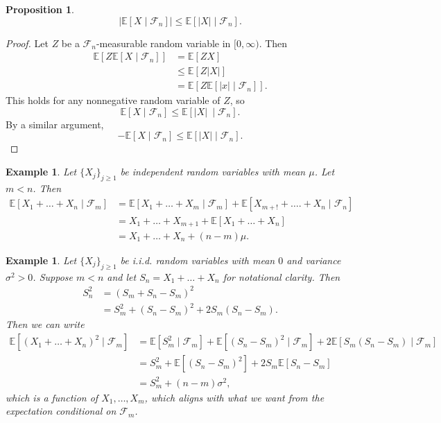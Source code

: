 \documentclass{tufte-handout}
\newcommand*\E{\mathbb{E}}
\newtheorem{ex}[thm]{Example}
\newtheorem{prop}[thm]{Proposition}
\theoremstyle{definition}
\begin{document}
\begin{prop}
	\[
		\left| \E\left[X \mid \mathscr{F}_n\right]  \right| \le \E\left[\left| X \right|\mid \mathscr{F}_n\right] 
	.\] 	
\end{prop}

\begin{proof}
	Let $Z$ be a $\mathscr{F}_n$-measurable random variable in $[0,\infty)$. Then
	\begin{align*}
		\E\left[Z \E\left[X \mid \mathscr{F}_n\right] \right] &= \E\left[ZX\right]  \\
		&\le \E\left[Z \left| X \right|\right]  \\
		&= \E\left[Z \E\left[\left| x \right| \mid \mathscr{F}_n\right] \right]
	.\end{align*}
	This holds for any nonnegative random variable of $Z$, so \[
		\E\left[X \mid \mathscr{F}_n\right] \le \E\left[\left| X \right|\ \mid \mathscr{F}_n\right] 
	.\] By a similar argument, \[
		-\E\left[X \mid \mathscr{F}_n\right] \le \E\left[\left| X \right| \mid \mathscr{F}_n\right] 
	.\] 
\end{proof}

\begin{ex}
	Let $\{X_j\}_{j \ge 1}$ be independent random variables with mean $\mu$. Let $m < n$. Then
	\begin{align*}
		\E\left[X_1+\ldots+X_n \mid \mathscr{F}_m\right] &= \E\left[X_1 +\ldots+X_m \mid \mathscr{F}_m\right] + \E\left[X_{m+!} + \ldots.+X_n \mid \mathscr{F}_n \right]  \\
		&= X_1+\ldots+X_{m+1} + \E\left[X_1 + \ldots+X_n\right] \\
		&= X_1+\ldots+X_n + \left( n-m \right)\mu
	.\end{align*}
\end{ex}

\begin{ex}
	Let $\{X_j\}_{j\ge 1}$ be i.i.d. random variables with mean $0$ and variance $\sigma^2 > 0$. Suppose $m < n$ and let $S_n = X_1 + \ldots+X_n$ for notational clarity. Then
	\begin{align*}
		S_n^2 &= \left( S_m + S_n - S_m \right)^2 \\
			  &= S_m^2 + (S_n-S_m)^2 + 2S_m(S_n - S_m)
	.\end{align*}
	Then we can write
	\begin{align*}
		\E\left[\left( X_1+\ldots+X_n \right)^2 \mid \mathscr{F}_m\right] &= \E\left[S_m^2 \mid \mathscr{F}_m\right] + \E\left[\left( S_n - S_m \right)^2 \mid \mathscr{F}_m\right] + 2 \E\left[S_m(S_n-S_m) \mid \mathscr{F}_m\right]  \\
		&= S_m^2 + \E\left[(S_n-S_m)^2\right] + 2S_m \E\left[S_n - S_m\right] \\
		&= S_m^2 + (n-m)\sigma^2
	,\end{align*} which is a function of $X_1,\ldots,X_m$, which aligns with what we want from the expectation conditional on $\mathscr{F}_m$.
\end{ex}
\end{document}
